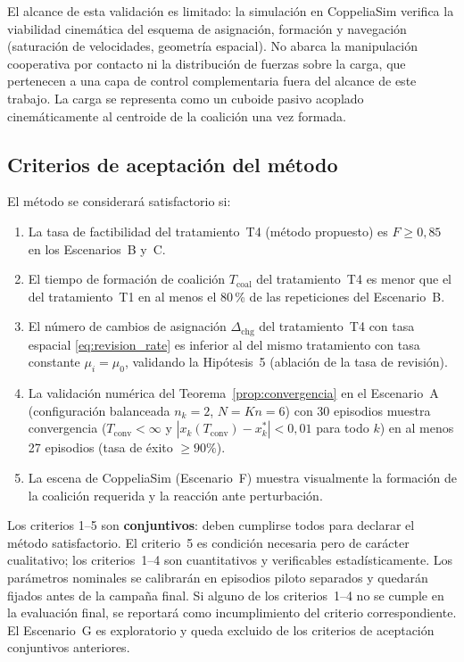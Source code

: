 El alcance de esta validación es limitado: la simulación en CoppeliaSim verifica la
viabilidad cinemática del esquema de asignación, formación y navegación (saturación de
velocidades, geometría espacial). No abarca la manipulación cooperativa por contacto ni
la distribución de fuerzas sobre la carga, que pertenecen a una capa de control
complementaria \citep{ebel2024cooperative, rosenfelder2024force} fuera del alcance de
este trabajo. La carga se representa como un cuboide pasivo acoplado cinemáticamente al
centroide de la coalición una vez formada.

\subsection{Criterios de aceptación del método}

El método se considerará satisfactorio si:

\begin{enumerate}
  \item La tasa de factibilidad del tratamiento~T4 (método propuesto) es
    $F \geq 0{,}85$ en los Escenarios~B y~C.
  \item El tiempo de formación de coalición $T_{\text{coal}}$ del tratamiento~T4
    es menor que el del tratamiento~T1 en al menos el 80\,\% de las repeticiones
    del Escenario~B.
  \item El número de cambios de asignación $\Delta_{\text{chg}}$ del
    tratamiento~T4 con tasa espacial \eqref{eq:revision_rate} es inferior al del
    mismo tratamiento con tasa constante $\mu_i = \mu_0$, validando la
    Hipótesis~5 (ablación de la tasa de revisión).
  \item La validación numérica del Teorema~\ref{prop:convergencia}
    en el Escenario~A (configuración balanceada $n_k=2$, $N=Kn=6$) con 30 episodios
    muestra convergencia ($T_{\mathrm{conv}} < \infty$ y
    $|x_k(T_{\text{conv}}) - x_k^*| < 0{,}01$ para todo $k$) en al menos 27 episodios
    (tasa de éxito ${\geq}90\%$).
  \item La escena de CoppeliaSim (Escenario~F) muestra visualmente la formación
    de la coalición requerida y la reacción ante perturbación.
\end{enumerate}

Los criterios 1--5 son \textbf{conjuntivos}: deben cumplirse todos para declarar el
método satisfactorio. El criterio~5 es condición necesaria pero de carácter
cualitativo; los criterios~1--4 son cuantitativos y verificables estadísticamente.
Los parámetros nominales se calibrarán en episodios piloto separados y quedarán fijados
antes de la campaña final. Si alguno de los criterios~1--4 no se cumple en la evaluación
final, se reportará como incumplimiento del criterio correspondiente. El Escenario~G es
exploratorio y queda excluido de los criterios de aceptación conjuntivos anteriores.

